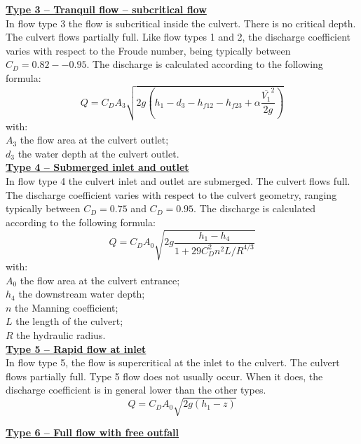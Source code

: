 \underline{\textbf{Type 3 -- Tranquil flow -- subcritical flow}}\\

In flow type 3 the flow is subcritical inside the culvert. There is no critical depth.
The culvert flows partially full. Like flow types 1 and 2, the discharge coefficient
varies with respect to the Froude number, being typically between $C_D=0.82 -- 0.95$.
The discharge is calculated according to the following formula:
\begin{equation}
Q=C_D A_3 \sqrt{2g\left(h_1-d_3-h_{f12}-h_{f23}+\alpha \dfrac{\overline{V_1}^2}{2g}\right)}
\end{equation}
with:\\
$A_3$ the flow area at the culvert outlet;\\
$d_3$ the water depth at the culvert outlet.\\

\underline{\textbf{Type 4 -- Submerged inlet and outlet}}\\

In flow type 4 the culvert inlet and outlet are submerged. The culvert flows full.
The discharge coefficient varies with respect to the culvert geometry, ranging
typically between $C_D=0.75$ and $C_D=0.95$.
The discharge is calculated according to the following formula:
\begin{equation}
Q=C_D A_0 \sqrt{2g\dfrac{h_1-h_4}{1+29C_D^2 n^2 L/R^{4/3}}}
\end{equation}
with:\\
$A_0$ the flow area at the culvert entrance;\\
$h_4$ the downstream water depth;\\
$n$ the Manning coefficient;\\
$L$ the length of the culvert;\\
$R$ the hydraulic radius.\\

\underline{\textbf{Type 5 -- Rapid flow at inlet}}\\

In flow type 5, the flow is supercritical at the inlet to the culvert.
The culvert flows partially full. Type 5 flow does not usually occur.
When it does, the discharge coefficient is in general lower than the other types.
\begin{equation}
Q=C_D A_0 \sqrt{2g(h_1-z)}
\end{equation}

\underline{\textbf{Type 6 -- Full flow with free outfall}}\\

